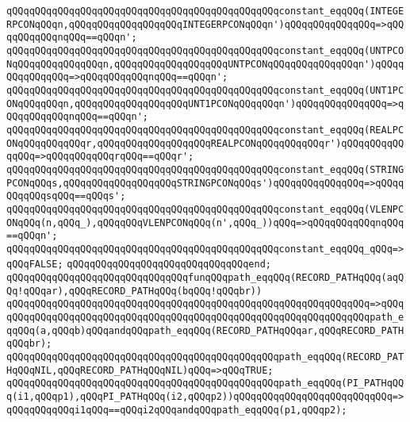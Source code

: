 \verb|qQQqqQQqqQQqqQQqqQQqqQQqqQQqqQQqqQQqqQQqqQQqqQQqconstant_eqqQQq(INTEGERPCONqQQqn,qQQqqQQqqQQqqQQqqQQqINTEGERPCONqQQqn')qQQqqQQqqQQqqQQq=>qQQqqQQqqQQqnqQQq==qQQqn';|\newline
\verb|qQQqqQQqqQQqqQQqqQQqqQQqqQQqqQQqqQQqqQQqqQQqqQQqconstant_eqqQQq(UNTPCONqQQqqQQqqQQqqQQqn,qQQqqQQqqQQqqQQqqQQqUNTPCONqQQqqQQqqQQqqQQqn')qQQqqQQqqQQqqQQq=>qQQqqQQqqQQqnqQQq==qQQqn';|\newline
\verb|qQQqqQQqqQQqqQQqqQQqqQQqqQQqqQQqqQQqqQQqqQQqqQQqconstant_eqqQQq(UNT1PCONqQQqqQQqn,qQQqqQQqqQQqqQQqqQQqUNT1PCONqQQqqQQqn')qQQqqQQqqQQqqQQq=>qQQqqQQqqQQqnqQQq==qQQqn';|\newline
\verb|qQQqqQQqqQQqqQQqqQQqqQQqqQQqqQQqqQQqqQQqqQQqqQQqconstant_eqqQQq(REALPCONqQQqqQQqqQQqr,qQQqqQQqqQQqqQQqqQQqREALPCONqQQqqQQqqQQqr')qQQqqQQqqQQqqQQq=>qQQqqQQqqQQqrqQQq==qQQqr';|\newline
\verb|qQQqqQQqqQQqqQQqqQQqqQQqqQQqqQQqqQQqqQQqqQQqqQQqconstant_eqqQQq(STRINGPCONqQQqs,qQQqqQQqqQQqqQQqqQQqSTRINGPCONqQQqs')qQQqqQQqqQQqqQQq=>qQQqqQQqqQQqsqQQq==qQQqs';|\newline
\verb|qQQqqQQqqQQqqQQqqQQqqQQqqQQqqQQqqQQqqQQqqQQqqQQqconstant_eqqQQq(VLENPCONqQQq(n,qQQq_),qQQqqQQqVLENPCONqQQq(n',qQQq_))qQQq=>qQQqqQQqqQQqnqQQq==qQQqn';|\newline
\verb|qQQqqQQqqQQqqQQqqQQqqQQqqQQqqQQqqQQqqQQqqQQqqQQqconstant_eqqQQq_qQQq=>qQQqFALSE;|\newline
\verb|qQQqqQQqqQQqqQQqqQQqqQQqqQQqqQQqend;|\newline
\newline
\newline
\verb|qQQqqQQqqQQqqQQqqQQqqQQqqQQqqQQqfunqQQqpath_eqqQQq(RECORD_PATHqQQq(aqQQq!qQQqar),qQQqRECORD_PATHqQQq(bqQQq!qQQqbr))|\newline
\verb|qQQqqQQqqQQqqQQqqQQqqQQqqQQqqQQqqQQqqQQqqQQqqQQqqQQqqQQqqQQqqQQq=>qQQq|\newline
\verb|qQQqqQQqqQQqqQQqqQQqqQQqqQQqqQQqqQQqqQQqqQQqqQQqqQQqqQQqqQQqqQQqpath_eqqQQq(a,qQQqb)qQQqandqQQqpath_eqqQQq(RECORD_PATHqQQqar,qQQqRECORD_PATHqQQqbr);|\newline
\newline
\verb|qQQqqQQqqQQqqQQqqQQqqQQqqQQqqQQqqQQqqQQqqQQqqQQqpath_eqqQQq(RECORD_PATHqQQqNIL,qQQqRECORD_PATHqQQqNIL)qQQq=>qQQqTRUE;|\newline
\verb|qQQqqQQqqQQqqQQqqQQqqQQqqQQqqQQqqQQqqQQqqQQqqQQqpath_eqqQQq(PI_PATHqQQq(i1,qQQqp1),qQQqPI_PATHqQQq(i2,qQQqp2))qQQqqQQqqQQqqQQqqQQqqQQqqQQq=>qQQqqQQqqQQqi1qQQq==qQQqi2qQQqandqQQqpath_eqqQQq(p1,qQQqp2);|\newline
